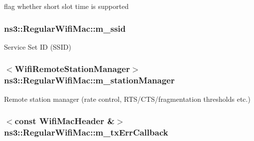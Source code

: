 flag whether short slot time is supported 

\subsubsection[{\texorpdfstring{m\+\_\+ssid}{m_ssid}}]{ ns3\+::\+Regular\+Wifi\+Mac\+::m\+\_\+ssid\hspace{0.3cm}{\ttfamily [protected]}}\hypertarget{classns3_1_1RegularWifiMac_ad641a8ee4b572b76198fc6cd408ada61}{}\label{classns3_1_1RegularWifiMac_ad641a8ee4b572b76198fc6cd408ada61}


Service Set ID (S\+S\+ID) 

\subsubsection[{\texorpdfstring{m\+\_\+station\+Manager}{m_stationManager}}]{$<${\bf Wifi\+Remote\+Station\+Manager}$>$ ns3\+::\+Regular\+Wifi\+Mac\+::m\+\_\+station\+Manager\hspace{0.3cm}{\ttfamily [protected]}}\hypertarget{classns3_1_1RegularWifiMac_a76d1a5e27b64bfe36f24a55d1eea2775}{}\label{classns3_1_1RegularWifiMac_a76d1a5e27b64bfe36f24a55d1eea2775}


Remote station manager (rate control, R\+T\+S/\+C\+T\+S/fragmentation thresholds etc.) 

\subsubsection[{\texorpdfstring{m\+\_\+tx\+Err\+Callback}{m_txErrCallback}}]{$<$const {\bf Wifi\+Mac\+Header} \&$>$ ns3\+::\+Regular\+Wifi\+Mac\+::m\+\_\+tx\+Err\+Callback\hspace{0.3cm}{\ttfamily [private]}}\hypertarget{classns3_1_1RegularWifiMac_ab206880e22c96a9e63e71d79957f75d0}{}\label{classns3_1_1RegularWifiMac_ab206880e22c96a9e63e71d79957f75d0}


